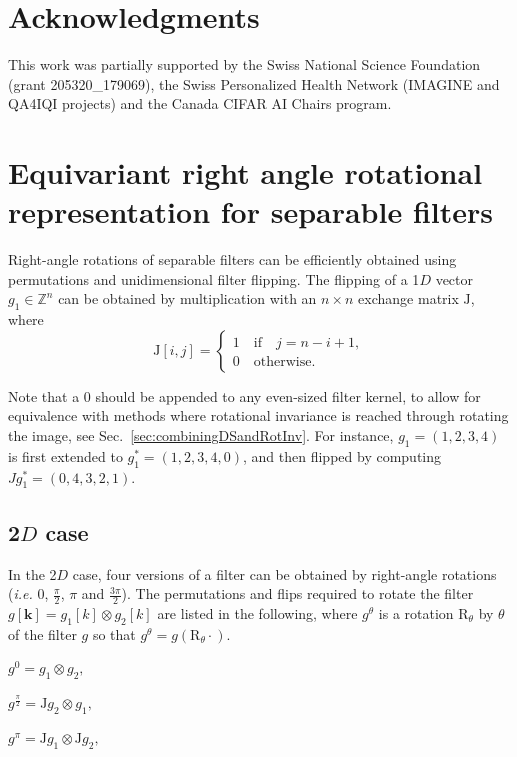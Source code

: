 \documentclass[fleqn,a4paper,oneside,openany]{book}
\begin{document}
\chapter*{Acknowledgments}
This work was partially supported by the Swiss National Science Foundation (grant 205320\_179069), the Swiss Personalized Health Network (IMAGINE and QA4IQI projects) and the Canada CIFAR AI Chairs program.



\appendix
\chapter{Equivariant right angle rotational representation for separable filters} \label{app:separableConvRightAngleEquivariant}
Right-angle rotations of separable filters can be efficiently obtained using permutations and unidimensional filter flipping.
The flipping of a 1$D$ vector $g_1 \in \mathbb{Z}^n$ can be obtained by multiplication with an $n\times n$ exchange matrix $\mathrm{J}$, where 
$$\mathrm{J}[i,j] = \begin{cases}
1\quad \text{if}\quad j=n-i+1,\\
0\quad \text{otherwise}.
\end{cases}$$

Note that a $0$ should be appended to any even-sized filter kernel, to allow for equivalence with methods where rotational invariance is reached through rotating the image, see Sec.~\ref{sec:combiningDSandRotInv}. For instance, $g_1 = (1,2,3,4)$ is first extended to $g_1^{*}=(1,2,3,4,0)$, and then flipped by computing $Jg_1^{*}=(0,4,3,2,1)$.

\section{2$D$ case}
In the 2$D$ case, four versions of a filter can be obtained by right-angle rotations (\textit{i.e.} $0$, $\frac{\pi}{2}$, $\pi$ and $\frac{3\pi}{2}$). The permutations and flips required to rotate the filter $g[\boldsymbol{k}]= g_{1}[k]\otimes g_{2}[k]$ are listed in the following, where $g^{\theta}$ is a rotation $\mathrm{R}_{\theta}$ by $\theta$  of the filter $g$ so that $g^{\theta}=g(\mathrm{R}_{\theta}\cdot)$.

$g^0= g_{1}\otimes g_{2},$

$g^{\frac{\pi}{2}}= \mathrm{J} g_{2}\otimes g_{1},$

$g^{\pi}= \mathrm{J} g_{1}\otimes \mathrm{J} g_{2},$
\end{document}
